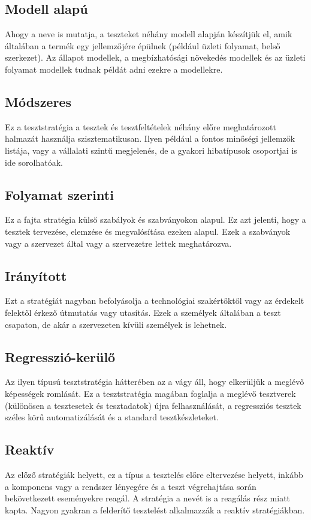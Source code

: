 \subsection{Modell alapú} Ahogy a neve is mutatja, a teszteket néhány modell alapján készítjük el, amik általában a termék egy jellemzőjére épülnek (például üzleti folyamat, belső szerkezet).	Az állapot modellek, a megbízhatósági növekedés modellek és az üzleti folyamat modellek tudnak példát adni ezekre a modellekre.


\subsection{Módszeres} Ez a tesztstratégia a tesztek és tesztfeltételek néhány előre meghatározott halmazát használja szisztematikusan. Ilyen például a fontos minőségi jellemzők listája, vagy a vállalati szintű megjelenés, de a  gyakori hibatípusok csoportjai is ide sorolhatóak.

\subsection{Folyamat szerinti} Ez a fajta stratégia külső szabályok és szabványokon alapul. Ez azt jelenti, hogy a tesztek tervezése, elemzése és megvalósítása ezeken alapul. Ezek a szabványok vagy a szervezet által vagy a szervezetre lettek meghatározva.

\subsection{Irányított} Ezt a stratégiát nagyban befolyásolja a technológiai szakértőktől vagy az érdekelt felektől érkező útmutatás vagy utasítás. Ezek a személyek általában a teszt csapaton, de akár a szervezeten kívüli személyek is lehetnek.

\subsection{Regresszió-kerülő} Az ilyen típusú tesztstratégia hátterében az a vágy áll, hogy elkerüljük a meglévő képességek romlását. Ez a tesztstratégia magában foglalja a meglévő tesztverek (különösen a tesztesetek és tesztadatok) újra felhasználását, a regressziós tesztek széles körű automatizálását és a standard tesztkészleteket\cite[~68. oldal]{syllabus4}.

\subsection{Reaktív} Az előző stratégiák helyett, ez a típus a tesztelés előre eltervezése helyett, inkább a komponens vagy a rendszer lényegére és a teszt végrehajtása során bekövetkezett eseményekre reagál. A stratégia a nevét is a reagálás rész miatt kapta. Nagyon gyakran a felderítő tesztelést alkalmazzák a reaktív stratégiákban\cite[~68. oldal]{syllabus4}.

